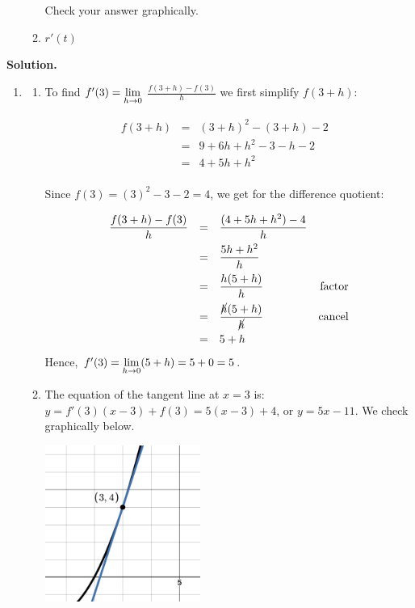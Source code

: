 \documentclass{ximera}
\begin{document}
\begin{example}
\begin{enumerate}
\begin{enumerate}
 Check your answer graphically.


 \item $r'(t)$ %
 
 \end{enumerate}

\end{enumerate}



{\bf Solution.}
 
\begin{enumerate}

\item \begin{enumerate} \item To find $f'(3) = \ds{\lim_{h \rightarrow 0}}$ $\frac{f(3+h)-f(3)}{h}$ we first simplify $f(3+h)$:

\[ \begin{array}{rclr}  
  f(3+h) & = & (3+h)^2 - (3+h) -2 & \\ 
  & = & 9 + 6h+h^2 - 3 - h -2 & \\
 & = & 4 + 5h + h^2 & \\
 \end{array} \]

Since $f(3) = (3)^2-3-2 = 4$, we get for the difference quotient:

\[ \begin{array}{rclr}

\dfrac{f(3+h)-f(3)}{h} & = & \dfrac{(4 + 5h + h^2) -4}{h} & \\[8pt]
                                & = & \dfrac{5h+h^2}{h} & \\[8pt]
                                & = &  \dfrac{h(5+h)}{h} & \text{factor} \\[8pt]
                                & = &  \dfrac{\cancel{h}(5+h)}{\cancel{h}} & \text{cancel}\\[8pt]
                                & = & 5+h \\ \end{array} \]
 Hence, $f'(3) = \ds{\lim_{h \rightarrow 0} (5+h) = 5+0 = 5}$.
 
 
 \item  The equation of the tangent line at $x = 3$ is:  $y = f'(3)(x-3) + f(3) = 5(x-3) + 4$, or $y = 5x-11$. We check graphically below.
 
 \begin{center}

 \includegraphics[width=2in]{./IntroductiontoDerivativesGraphics/TLEx201.png} 
 

\end{center}
\end{enumerate}
\end{enumerate}
\end{example}
\end{document}
